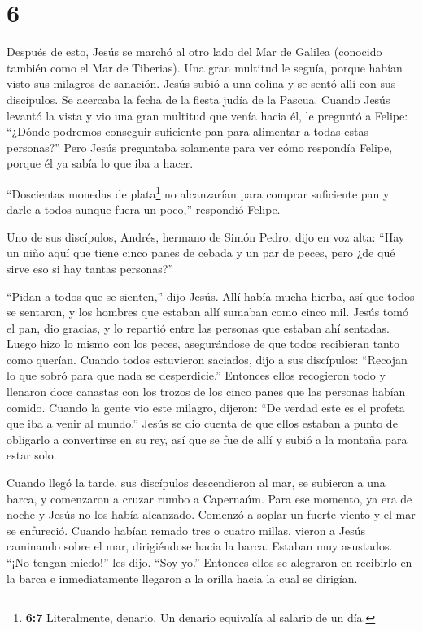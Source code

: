 \hypertarget{section-5}{%
\section{6}\label{section-5}}

 Después de esto, Jesús se marchó al otro lado del Mar de
Galilea (conocido también como el Mar de Tiberias).  Una
gran multitud le seguía, porque habían visto sus milagros de sanación.
 Jesús subió a una colina y se sentó allí con sus
discípulos.  Se acercaba la fecha de la fiesta judía de la
Pascua.  Cuando Jesús levantó la vista y vio una gran
multitud que venía hacia él, le preguntó a Felipe: ``¿Dónde podremos
conseguir suficiente pan para alimentar a todas estas personas?''
 Pero Jesús preguntaba solamente para ver cómo respondía
Felipe, porque él ya sabía lo que iba a hacer.

 ``Doscientas monedas de plata\footnote{\textbf{6:7}
  Literalmente, denario. Un denario equivalía al salario de un día.} no
alcanzarían para comprar suficiente pan y darle a todos aunque fuera un
poco,'' respondió Felipe.

 Uno de sus discípulos, Andrés, hermano de Simón Pedro, dijo
en voz alta:  ``Hay un niño aquí que tiene cinco panes de
cebada y un par de peces, pero ¿de qué sirve eso si hay tantas
personas?''

 ``Pidan a todos que se sienten,'' dijo Jesús. Allí había
mucha hierba, así que todos se sentaron, y los hombres que estaban allí
sumaban como cinco mil.  Jesús tomó el pan, dio gracias, y
lo repartió entre las personas que estaban ahí sentadas. Luego hizo lo
mismo con los peces, asegurándose de que todos recibieran tanto como
querían.  Cuando todos estuvieron saciados, dijo a sus
discípulos: ``Recojan lo que sobró para que nada se desperdicie.''
 Entonces ellos recogieron todo y llenaron doce canastas
con los trozos de los cinco panes que las personas habían comido.
 Cuando la gente vio este milagro, dijeron: ``De verdad
este es el profeta que iba a venir al mundo.''  Jesús se
dio cuenta de que ellos estaban a punto de obligarlo a convertirse en su
rey, así que se fue de allí y subió a la montaña para estar solo.

 Cuando llegó la tarde, sus discípulos descendieron al mar,
 se subieron a una barca, y comenzaron a cruzar rumbo a
Capernaúm. Para ese momento, ya era de noche y Jesús no los había
alcanzado.  Comenzó a soplar un fuerte viento y el mar se
enfureció.  Cuando habían remado tres o cuatro millas,
vieron a Jesús caminando sobre el mar, dirigiéndose hacia la barca.
Estaban muy asustados.  ``¡No tengan miedo!'' les dijo.
``Soy yo.''  Entonces ellos se alegraron en recibirlo en la
barca e inmediatamente llegaron a la orilla hacia la cual se dirigían.


